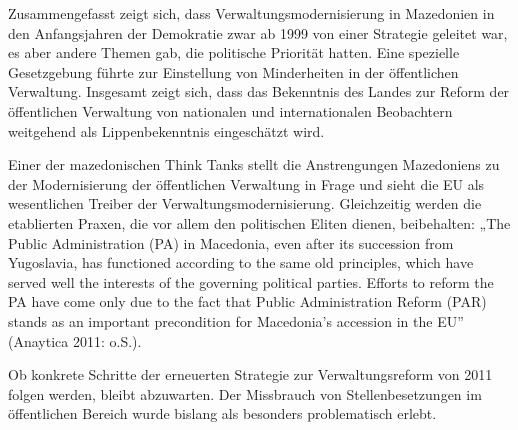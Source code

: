 Zusammengefasst zeigt sich, dass Verwaltungsmodernisierung in Mazedonien in den Anfangsjahren der Demokratie zwar ab 1999 von einer Strategie geleitet war, es aber andere Themen gab, die politische Priorität hatten. Eine spezielle Gesetzgebung führte zur Einstellung von Minderheiten in der öffentlichen Verwaltung. Insgesamt zeigt sich, dass das Bekenntnis des Landes zur Reform der öffentlichen Verwaltung von nationalen und internationalen Beobachtern weitgehend als Lippenbekenntnis eingeschätzt wird.\par
Einer der mazedonischen Think Tanks stellt die Anstrengungen Mazedoniens zu der Modernisierung der öffentlichen Verwaltung in Frage und sieht die EU als wesentlichen Treiber der Verwaltungsmodernisierung. Gleichzeitig werden die etablierten Praxen, die vor allem den politischen Eliten dienen, beibehalten: „The Public Administration (PA) in Macedonia, even after its succession from Yugoslavia, has functioned according to the same old principles, which have served well the interests of the governing political parties. Efforts to reform the PA have come only due to the fact that Public Administration Reform (PAR) stands as an important precondition for Macedonia’s accession in the EU” (Anaytica 2011: o.S.).\par
Ob konkrete Schritte der erneuerten Strategie zur Verwaltungsreform von 2011 folgen werden, bleibt abzuwarten. Der Missbrauch von Stellenbesetzungen im öffentlichen Bereich wurde bislang als besonders problematisch erlebt. 

